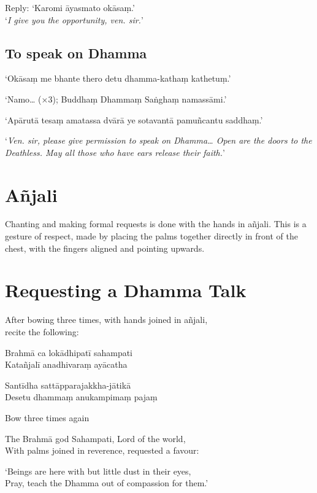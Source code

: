 Reply: ‘Karomi āyasmato okāsaṃ.’\\
‘\emph{I give you the opportunity, ven. sir.}’ 

\clearpage

\subsection{To speak on Dhamma}


‘Okāsaṃ me bhante thero detu dhamma-kathaṃ kathetuṃ.’

‘Namo… (×3); Buddhaṃ Dhammaṃ Saṅghaṃ namassāmi.’

‘Apārutā tesaṃ amatassa dvārā ye sotavantā pamuñcantu saddhaṃ.’

‘\emph{Ven. sir, please give permission to speak on Dhamma… Open are the doors
  to the Deathless. May all those who have ears release their faith.}’

\section{Añjali}

Chanting and making formal requests is done with the hands in añjali.
This is a gesture of respect, made by placing the palms together
directly in front of the chest, with the fingers aligned and pointing
upwards.

\section{Requesting a Dhamma Talk}

\begin{instruction}
  After bowing three times, with hands joined in añjali,\\
  recite the following:
\end{instruction}

Brahmā ca lokādhipatī sahampati\\
Katañjalī anadhivaraṃ ayācatha

Santīdha sattāpparajakkha-jātikā\\
Desetu dhammaṃ anukampimaṃ pajaṃ

\begin{instruction}
  Bow three times again
\end{instruction}

\begin{english}
The Brahmā god Sahampati, Lord of the world,\\
With palms joined in reverence, requested a favour:

`Beings are here with but little dust in their eyes,\\
Pray, teach the Dhamma out of compassion for them.' 
\end{english}

